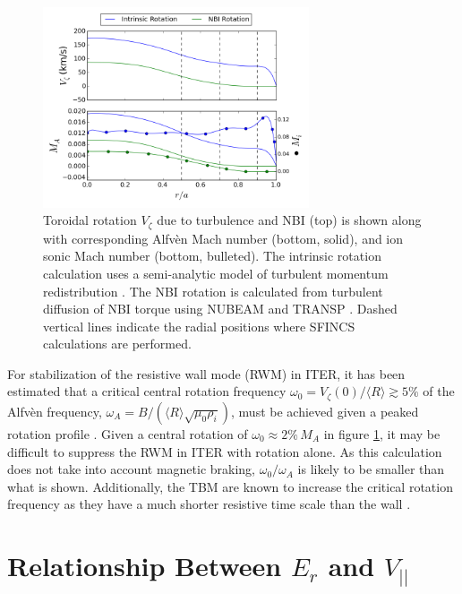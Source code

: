 \documentclass{article}
\numberwithin{figure}{section}
\numberwithin{equation}{section}
\begin{document}
\begin{figure}[h!]
\centering
\includegraphics[width=0.7\textwidth]{rotationestimate.png}
\caption{\label{fig:rotation_estimate} Toroidal rotation $V_{\zeta}$ due to turbulence and NBI (top) is shown along with  corresponding Alfv\`{e}n Mach number (bottom, solid), and ion sonic Mach number (bottom, bulleted). The intrinsic rotation calculation uses a semi-analytic model of turbulent momentum redistribution \cite{Hillesheim2015}. The NBI rotation is calculated from turbulent diffusion of NBI torque using NUBEAM and TRANSP \cite{Poli2014}. Dashed vertical lines indicate the radial positions where SFINCS calculations are performed. }
\end{figure}

For stabilization of the resistive wall mode (RWM) in ITER, it has been estimated that a critical central rotation frequency $\omega_0 = V_{\zeta}(0)/\langle R \rangle \gtrsim 5\%$ of the Alfv\`{e}n frequency, $\omega_A = B/(\langle R\rangle\sqrt{\mu_0 \rho_i})$, must be achieved given a peaked rotation profile  \cite{Liu2004}. Given a central rotation of $\omega_0 \approx 2\% \, M_A$ in figure \ref{fig:rotation_estimate}, it may be difficult to suppress the RWM in ITER with rotation alone. As this calculation does not take into account magnetic braking, $\omega_0/\omega_A$ is likely to be smaller than what is shown. Additionally, the TBM are known to increase the critical rotation frequency as they have a much shorter resistive time scale than the wall \cite{Liu2004}.

\FloatBarrier

\section{Relationship Between $E_r$ and $V_{||}$}\label{Erandv}
\end{document}
